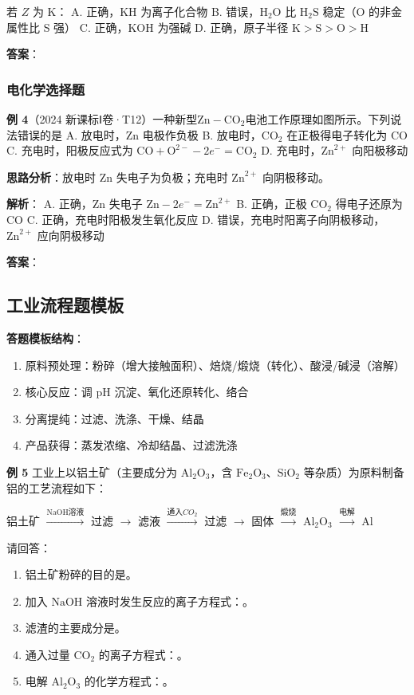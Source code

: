 若 $Z$ 为 K：
A. 正确，$\text{KH}$ 为离子化合物
B. 错误，$\text{H}_2\text{O}$ 比 $\text{H}_2\text{S}$ 稳定（O 的非金属性比 S 强）
C. 正确，$\text{KOH}$ 为强碱
D. 正确，原子半径 $\text{K} > \text{S} > \text{O} > \text{H}$

\textbf{答案}：

\subsubsection{电化学选择题}

\textbf{例 4}（2024 新课标Ⅰ卷·T12）一种新型$\text{Zn}-\text{CO}_2$电池工作原理如图所示。下列说法错误的是
A. 放电时，$\text{Zn}$ 电极作负极
B. 放电时，$\text{CO}_2$ 在正极得电子转化为 $\text{CO}$
C. 充电时，阳极反应式为 $\text{CO} + \text{O}^{2-} - 2e^- = \text{CO}_2$
D. 充电时，$\text{Zn}^{2+}$ 向阳极移动

\textbf{思路分析}：放电时 $\text{Zn}$ 失电子为负极；充电时 $\text{Zn}^{2+}$ 向阴极移动。

\textbf{解析}：
A. 正确，$\text{Zn}$ 失电子 $\text{Zn} - 2e^- = \text{Zn}^{2+}$
B. 正确，正极 $\text{CO}_2$ 得电子还原为 $\text{CO}$
C. 正确，充电时阳极发生氧化反应
D. 错误，充电时阳离子向阴极移动，$\text{Zn}^{2+}$ 应向阴极移动

\textbf{答案}：

\subsection{工业流程题模板}

\textbf{答题模板结构}：
\begin{enumerate}
  \item 原料预处理：粉碎（增大接触面积）、焙烧/煅烧（转化）、酸浸/碱浸（溶解）
  \item 核心反应：调 pH 沉淀、氧化还原转化、络合
  \item 分离提纯：过滤、洗涤、干燥、结晶
  \item 产品获得：蒸发浓缩、冷却结晶、过滤洗涤
\end{enumerate}

\textbf{例 5} 工业上以铝土矿（主要成分为 $\text{Al}_2\text{O}_3$，含 $\text{Fe}_2\text{O}_3$、$\text{SiO}_2$ 等杂质）为原料制备铝的工艺流程如下：

铝土矿 $\xrightarrow{\text{NaOH溶液}}$ 过滤 $\to$ 滤液 $\xrightarrow{通入CO_2}$ 过滤 $\to$ 固体 $\xrightarrow{\text{煅烧}}$ $\text{Al}_2\text{O}_3$ $\xrightarrow{\text{电解}}$ $\text{Al}$

请回答：
\begin{enumerate}
  \item 铝土矿粉碎的目的是\underline{\qquad\qquad}。
  \item 加入 $\text{NaOH}$ 溶液时发生反应的离子方程式：\underline{\qquad\qquad}。
  \item 滤渣的主要成分是\underline{\qquad\qquad}。
  \item 通入过量 $\text{CO}_2$ 的离子方程式：\underline{\qquad\qquad}。
  \item 电解 $\text{Al}_2\text{O}_3$ 的化学方程式：\underline{\qquad\qquad}。
\end{enumerate}

